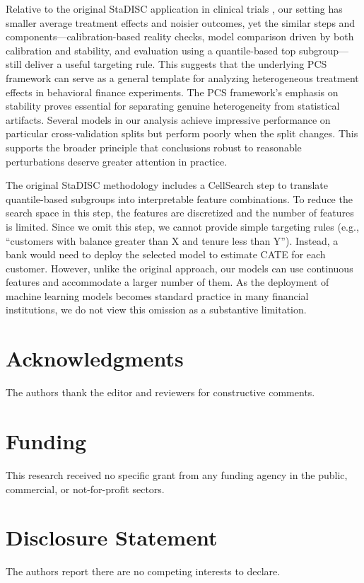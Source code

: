 \documentclass[12pt]{article}
\begin{document}
Relative to the original StaDISC application in clinical trials \citep{dwivedi2020}, our setting has smaller average treatment effects and noisier outcomes, yet the similar steps and components---calibration-based reality checks, model comparison driven by both calibration and stability, and evaluation using a quantile-based top subgroup---still deliver a useful targeting rule. This suggests that the underlying PCS framework can serve as a general template for analyzing heterogeneous treatment effects in behavioral finance experiments. The PCS framework's emphasis on stability proves essential for separating genuine heterogeneity from statistical artifacts. Several models in our analysis achieve impressive performance on particular cross-validation splits but perform poorly when the split changes. This supports the broader principle that conclusions robust to reasonable perturbations deserve greater attention in practice.

The original StaDISC methodology includes a CellSearch step to translate quantile-based subgroups into interpretable feature combinations. To reduce the search space in this step, the features are discretized and the number of features is limited. Since we omit this step, we cannot provide simple targeting rules (e.g., ``customers with balance greater than X and tenure less than Y''). Instead, a bank would need to deploy the selected model to estimate CATE for each customer. However, unlike the original approach, our models can use continuous features and accommodate a larger number of them. As the deployment of machine learning models becomes standard practice in many financial institutions, we do not view this omission as a substantive limitation.
\section*{Acknowledgments}
The authors thank the editor and reviewers for constructive comments.

\section*{Funding}
This research received no specific grant from any funding agency in the public, commercial, or not-for-profit sectors.

\section*{Disclosure Statement}
The authors report there are no competing interests to declare.
\end{document}
